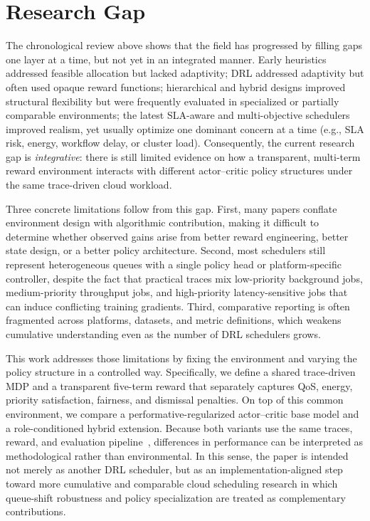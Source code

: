 \documentclass[journal]{IEEEtran}
\begin{document}
\section{Research Gap} \label{sec:gap}
The chronological review above shows that the field has progressed by filling gaps one layer at a time, but not yet in an integrated manner. Early heuristics addressed feasible allocation but lacked adaptivity; DRL addressed adaptivity but often used opaque reward functions; hierarchical and hybrid designs improved structural flexibility but were frequently evaluated in specialized or partially comparable environments; the latest SLA-aware and multi-objective schedulers improved realism, yet usually optimize one dominant concern at a time (e.g., SLA risk, energy, workflow delay, or cluster load). Consequently, the current research gap is \emph{integrative}: there is still limited evidence on how a transparent, multi-term reward environment interacts with different actor--critic policy structures under the same trace-driven cloud workload.

Three concrete limitations follow from this gap. First, many papers conflate environment design with algorithmic contribution, making it difficult to determine whether observed gains arise from better reward engineering, better state design, or a better policy architecture. Second, most schedulers still represent heterogeneous queues with a single policy head or platform-specific controller, despite the fact that practical traces mix low-priority background jobs, medium-priority throughput jobs, and high-priority latency-sensitive jobs that can induce conflicting training gradients. Third, comparative reporting is often fragmented across platforms, datasets, and metric definitions, which weakens cumulative understanding even as the number of DRL schedulers grows.

This work addresses those limitations by fixing the environment and varying the policy structure in a controlled way. Specifically, we define a shared trace-driven MDP and a transparent five-term reward that separately captures QoS, energy, priority satisfaction, fairness, and dismissal penalties. On top of this common environment, we compare a performative-regularized actor--critic base model and a role-conditioned hybrid extension. Because both variants use the same traces, reward, and evaluation pipeline~\cite{reiss2011googlecluster, zhang2025s41598}, differences in performance can be interpreted as methodological rather than environmental. In this sense, the paper is intended not merely as another DRL scheduler, but as an implementation-aligned step toward more cumulative and comparable cloud scheduling research in which queue-shift robustness and policy specialization are treated as complementary contributions.
\end{document}
